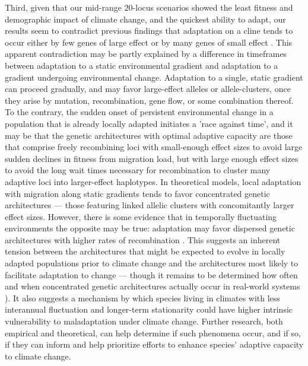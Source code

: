 \documentclass[9pt,twocolumn,twoside,lineno]{pnas-new}
\begin{document}
Third, given that our mid-range 20-locus scenarios
showed the least fitness and demographic impact of climate change,
and the quickest ability to adapt,
our results seem to contradict previous findings that adaptation on a cline tends to 
occur either by few genes of large effect or by many genes of small effect 
\cite{yeaman_amnat,yeaman_review}. 
This apparent contradiction may be partly explained by a 
difference in timeframes between adaptation to a static environmental gradient
and adaptation to a gradient undergoing environmental change. 
Adaptation to a single, static gradient can proceed gradually,
and may favor large-effect alleles or allele-clusters,
once they arise by mutation, recombination, gene flow, or some combination thereof. 
To the contrary, the sudden onset of persistent environmental change 
in a population that is already locally adapted initiates a 'race against time', 
and it may be that the genetic architectures with
optimal adaptive capacity are those that comprise freely recombining loci with small-enough effect sizes to avoid large
sudden declines in fitness from migration load,
but with large enough effect sizes to avoid the long wait times necessary for recombination to cluster many adaptive loci into larger-effect haplotypes.
In theoretical models, local adaptation with migration along static 
gradients tends to favor concentrated genetic architectures ---
those featuring linked allelic clusters with concomitantly larger effect sizes.
However, there is some evidence that in temporally fluctuating environments the opposite may be true:
adaptation may favor dispersed genetic architectures with higher rates of recombination
\cite{burger,kondrashov,yeaman_review,yeaman_whitlock}.
This suggests an inherent tension between the architectures that
might be expected to evolve in locally adapted populations prior to climate change
and the architectures most likely to facilitate adaptation to change --- though it remains to be determined how 
often and when concentrated genetic architectures actually occur in 
real-world systems \cite{laruson}).
It also suggests a mechanism by which species living in climates with 
less interannual fluctuation and longer-term stationarity could have
higher intrinsic vulnerability to maladaptation under climate 
change. Further research, both empirical and theoretical,
can help determine if such phenomena occur, and if so,
if they can inform and help prioritize efforts to enhance species'
adaptive capacity to climate change.
\end{document}
